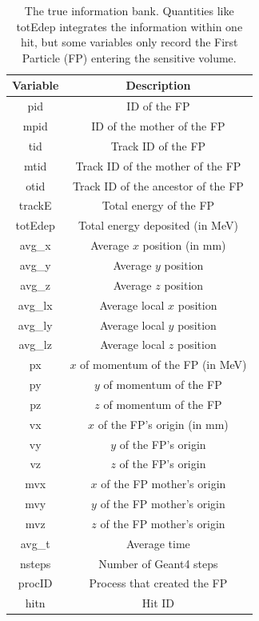 \begin{table}[h]
	\small
	\begin{center}
		\begin{tabular}{| c | c |}
			\hline \hline
			Variable    & Description  \\
			\hline
				pid         &   ID of the FP                     \\
				mpid        &   ID of the mother of the FP \\
				tid         &   Track ID of the FP\\
				mtid        &   Track ID of the mother of the FP  \\
				otid        &   Track ID of the ancestor of the FP \\
				trackE      &   Total energy of the FP \\
				totEdep     &   Total energy deposited (in MeV) \\
				avg\_x      &   Average $x$ position  (in mm) \\
				avg\_y      &   Average $y$ position  \\
				avg\_z      &   Average $z$ position  \\
				avg\_lx     &   Average local $x$ position \\
				avg\_ly     &   Average local $y$ position \\
				avg\_lz     &   Average local $z$ position \\
				px          &   $x$  of momentum of the FP (in MeV) \\
				py          &   $y$  of momentum of the FP \\
				pz          &   $z$  of momentum of the FP \\
				vx          &   $x$  of the FP's origin (in mm) \\
				vy          &   $y$  of the FP's origin \\
				vz          &   $z$  of the FP's origin \\
				mvx         &   $x$  of the FP mother's origin\\
				mvy         &   $y$  of the FP mother's origin \\
				mvz         &   $z$  of the FP mother's origin \\
				avg\_t      &   Average time \\
				nsteps      &   Number of Geant4 steps \\
				procID      &   Process that created the FP  \\
				hitn        &   Hit ID \\
			\hline \hline
		\end{tabular}
	\end{center}
	\caption{The true information bank. Quantities like totEdep integrates the information within one hit, but some
             variables only record the First Particle (FP) entering the sensitive volume.}\label{tab:trueInformation}
\end{table}


